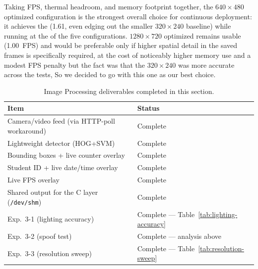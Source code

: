
Taking FPS, thermal headroom, and memory footprint together, the
$640\times480$ optimized configuration is the strongest overall choice for
continuous deployment: it achieves the  (1.61, even edging out the smaller $320\times240$
baseline) while running at the  of the
five configurations. $1280\times720$ optimized remains usable
(1.00~FPS) and would be preferable only if higher spatial detail in the
saved frames is specifically required, at the cost of noticeably higher
memory use and a modest FPS penalty but the fact was that the $320\times240$ was more accurate across the tests, So we decided to go with this one as our best choice.


\begin{table}[H]
\centering
\caption{Image Processing deliverables completed in this section.}
\label{tab:imgproc-summary}
\begin{tabular}{ll}
\toprule
\textbf{Item} & \textbf{Status} \\
\midrule
Camera/video feed (via HTTP-poll workaround) & Complete \\
Lightweight detector (HOG+SVM) & Complete \\
Bounding boxes + live counter overlay & Complete \\
Student ID + live date/time overlay & Complete \\
Live FPS overlay & Complete \\
Shared output for the C layer (\texttt{/dev/shm}) & Complete \\
Exp.\ 3-1 (lighting accuracy) & Complete --- Table~\ref{tab:lighting-accuracy} \\
Exp.\ 3-2 (spoof test) & Complete --- analysis above \\
Exp.\ 3-3 (resolution sweep) & Complete --- Table~\ref{tab:resolution-sweep} \\
\bottomrule
\end{tabular}
\end{table}
